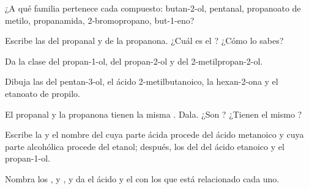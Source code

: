 \begin{exercise}[$\star$]\label{exo:g11:functional-groups:3}
¿A qué familia pertenece cada compuesto: butan-2-ol, pentanal,
propanoato de metilo, propanamida, 2-bromopropano, but-1-eno?
\end{exercise}

\begin{exercise}[$\star$]\label{exo:g11:functional-groups:4}
Escribe las  del propanal y de la propanona.
¿Cuál es el ? ¿Cómo lo sabes?
\end{exercise}

\begin{exercise}[$\star$]\label{exo:g11:functional-groups:5}
Da la clase del propan-1-ol, del propan-2-ol y del 2-metilpropan-2-ol.
\end{exercise}

\begin{exercise}[$\star\star$]\label{exo:g11:functional-groups:6}
Dibuja las  del pentan-3-ol, el ácido
2-metilbutanoico, la hexan-2-ona y el etanoato de propilo.
\end{exercise}

\begin{exercise}[$\star\star$]\label{exo:g11:functional-groups:7}
El propanal y la propanona tienen la misma . Dala. ¿Son
? ¿Tienen el mismo ?
\end{exercise}

\begin{exercise}[$\star\star$]\label{exo:g11:functional-groups:8}
Escribe la  y el nombre del  cuya parte
ácida procede del ácido metanoico  y cuya parte alcohólica
procede del etanol; después, los del  del ácido etanoico y el
propan-1-ol.
\end{exercise}

\begin{exercise}[$\star\star$]\label{exo:g11:functional-groups:9}
Nombra los  ,  y
, y da el ácido y el  con los que está relacionado
cada uno.
\end{exercise}

